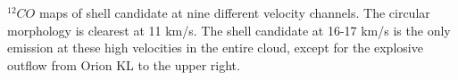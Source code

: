 \label{fig:channelmaps} $^{12}CO$ maps of shell candidate at nine different velocity channels. The circular morphology is clearest at 11 km/s. The shell candidate at 16-17 km/s is the only emission at these high velocities in the entire cloud, except for the explosive outflow from Orion KL to the upper right.